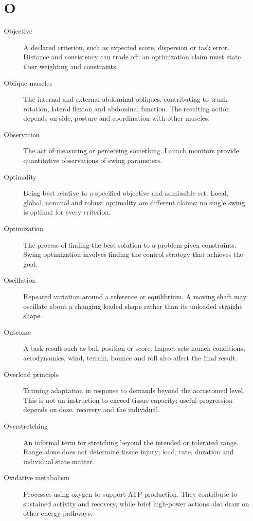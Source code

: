 \section*{O}
\begin{description}

\item[Objective] A declared criterion, such as expected score, dispersion or task error. Distance and consistency can trade off; an optimization claim must state their weighting and constraints.

\item[Oblique muscles] The internal and external abdominal obliques, contributing to trunk rotation, lateral flexion and abdominal function. The resulting action depends on side, posture and coordination with other muscles.

\item[Observation] The act of measuring or perceiving something. Launch monitors provide quantitative observations of swing parameters.

\item[Optimality] Being best relative to a specified objective and admissible set. Local, global, nominal and robust optimality are different claims; no single swing is optimal for every criterion.

\item[Optimization] The process of finding the best solution to a problem given constraints. Swing optimization involves finding the control strategy that achieves the goal.

\item[Oscillation] Repeated variation around a reference or equilibrium. A moving shaft may oscillate about a changing loaded shape rather than its unloaded straight shape.

\item[Outcome] A task result such as ball position or score. Impact sets launch conditions; aerodynamics, wind, terrain, bounce and roll also affect the final result.

\item[Overload principle] Training adaptation in response to demands beyond the accustomed level. This is not an instruction to exceed tissue capacity; useful progression depends on dose, recovery and the individual.

\item[Overstretching] An informal term for stretching beyond the intended or tolerated range. Range alone does not determine tissue injury; load, rate, duration and individual state matter.

\item[Oxidative metabolism] Processes using oxygen to support ATP production. They contribute to sustained activity and recovery, while brief high-power actions also draw on other energy pathways.

\end{description}

